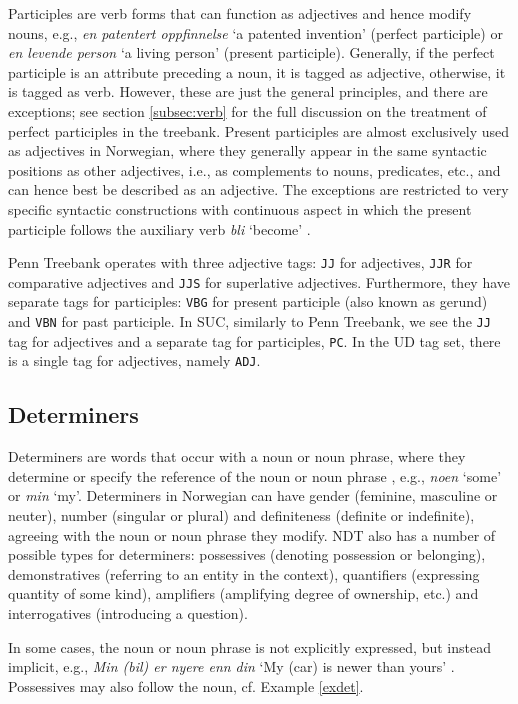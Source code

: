\documentclass[a4paper,12pt,english]{book}
\begin{document}
Participles are verb forms that can function as adjectives and hence modify
nouns, e.g., \emph{en patentert oppfinnelse} `a patented invention' (perfect
participle) or \emph{en levende person} `a living person' (present participle).
Generally, if the perfect participle is an attribute preceding a noun, it is
tagged as adjective, otherwise, it is tagged as verb. However, these are just
the general principles, and there are exceptions; see section \ref{subsec:verb}
for the full discussion on the treatment of perfect participles in the
treebank. Present participles are almost exclusively used as adjectives in
Norwegian, where they generally appear in the same syntactic positions as other
adjectives, i.e., as complements to nouns, predicates, etc., and can hence best
be described as an adjective. The exceptions are restricted to very specific
syntactic constructions with continuous aspect in which the present participle
follows the auxiliary verb \emph{bli} `become' \cite{Faa:Lie:Van:97}.

Penn Treebank operates with three adjective tags: \texttt{JJ} for adjectives,
\texttt{JJR} for comparative adjectives and \texttt{JJS} for superlative
adjectives. Furthermore, they have separate tags for participles: \texttt{VBG}
for present participle (also known as gerund) and \texttt{VBN} for past
participle. In SUC, similarly to Penn Treebank, we see the \texttt{JJ} tag for
adjectives and a separate tag for participles, \texttt{PC}. In the UD tag set,
there is a single tag for adjectives, namely \texttt{ADJ}.

\subsection{Determiners}
\label{subsec:det}
Determiners are words that occur with a noun or noun phrase, where they
determine or specify the reference of the noun or noun phrase
\cite{Faa:Lie:Van:97}, e.g., \emph{noen} `some' or \emph{min} `my'. Determiners
in Norwegian can have gender (feminine, masculine or neuter), number (singular
or plural) and definiteness (definite or indefinite), agreeing with the noun or
noun phrase they modify. NDT also has a number of possible types for
determiners: possessives (denoting possession or belonging), demonstratives
(referring to an entity in the context), quantifiers (expressing quantity
of some kind), amplifiers (amplifying degree of ownership, etc.) and
interrogatives (introducing a question).

In some cases, the noun or noun phrase is not explicitly expressed, but instead
implicit, e.g., \emph{Min (bil) er nyere enn din} `My (car) is newer than
yours' \cite{Faa:Lie:Van:97}. Possessives may also follow the noun, cf. Example
\ref{exdet}.
\end{document}

